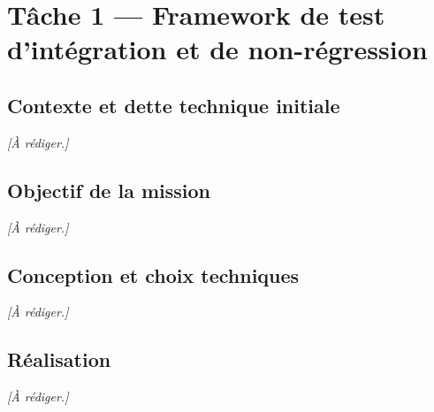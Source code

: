 \chapter{Tâche 1 — Framework de test d'intégration et de non-régression}
\label{chap:t1}


\section{Contexte et dette technique initiale}
\emph{[À rédiger.]}

\section{Objectif de la mission}
\emph{[À rédiger.]}

\section{Conception et choix techniques}
\emph{[À rédiger.]}

\section{Réalisation}
\emph{[À rédiger.]}


